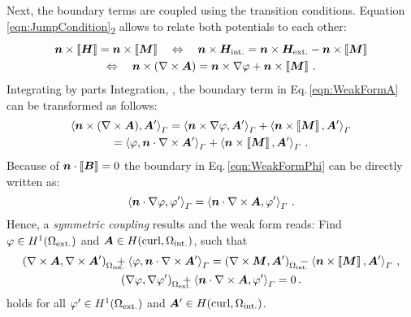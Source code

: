 Next, the boundary terms are coupled using the transition conditions. Equation\,\eqref{eqn:JumpCondition}\textsubscript{2} allows to relate both potentials to each other:
\begin{multline}
	\bm{n}\times\jump{\bm{H}}=\bm{n}\times\jump{\bm{M}}\quad \Leftrightarrow \quad \bm{n}\times\bm{H}_\mathrm{int.}=\bm{n}\times\bm{H}_\mathrm{ext.}-\bm{n}\times\jump{\bm{M}}\\
	\Leftrightarrow \quad \bm{n}\times(\nabla\times\bm{A})=\bm{n}\times\nabla\vp+\bm{n}\times\jump{\bm{M}}\,.
\end{multline}
Integrating by parts Integration, \cite[58\psq]{Monk2003}, the boundary term in Eq.\,\eqref{eqn:WeakFormA} can be transformed as follows:
\begin{multline}
	\left\langle\bm{n}\times(\nabla\times\bm{A}),\bm{A}'\right\rangle_{\varGamma}
	=\left\langle\bm{n}\times\nabla\varphi,\bm{A}'\right\rangle_{\varGamma}+\left\langle\bm{n}\times\left[\!\left[\bm{M}\right]\!\right],\bm{A}'\right\rangle_{\varGamma}\\
	=\left\langle\varphi,\bm{n}\cdot\nabla\times\bm{A}'\right\rangle_{\varGamma}+\left\langle\bm{n}\times\left[\!\left[\bm{M}\right]\!\right],\bm{A}'\right\rangle_{\varGamma}\,.
\end{multline}
Because of $\bm{n}\cdot\left[\!\left[\bm{B}\right]\!\right]=0$ the boundary in Eq.\,\eqref{eqn:WeakFormPhi} can be directly written as:
\begin{equation}
	\label{eqn:RandPhi}
	\left\langle\bm{n}\cdot\nabla\varphi,\varphi'\right\rangle_{\varGamma}=\left\langle\bm{n}\cdot\nabla\times\bm{A},\varphi'\right\rangle_{\varGamma}\,.
\end{equation}
Hence, a \emph{symmetric coupling} results and the weak form reads: 
Find $\varphi\in H^1(\Omega_\mathrm{ext.})$ and $\bm{A}\in H(\operatorname{curl}, \Omega_\mathrm{int.})$, such that
\begin{subequations}
\label{eqn:WeakFormFinal}
\begin{gather}
	\left(\nabla\times\bm{A},\nabla\times\bm{A}'\right)_{\mathrlap{\Omega_\mathrm{int.}}\ \ }+\left\langle\vp,\bm{n}\cdot\nabla\times\bm{A}'\right\rangle_{\varGamma}
	=\left(\nabla\times\bm{M},\bm{A}'\right)_{\mathrlap{\Omega_\mathrm{int.}}\ \ }-\left\langle\bm{n}\times\jump{\bm{M}},\bm{A}'\right\rangle_{\varGamma}\,,\\
	\left(\nabla\vp,\nabla\vp'\right)_{\mathrlap{\Omega_\mathrm{ext.}}\ \ }+\left\langle\bm{n}\cdot\nabla\times\bm{A},\vp'\right\rangle_{\varGamma}=0\,.
\end{gather}
\end{subequations}
holds for all $\varphi'\in H^1(\Omega_\mathrm{ext.})$ and $\bm{A}'\in H(\operatorname{curl}, \Omega_\mathrm{int.})$.

